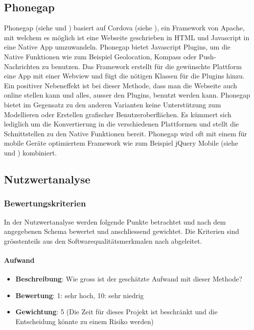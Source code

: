 \subsection{Phonegap}\label{architektur_phonegapt}
Phonegap (siehe \cite{phonegap} und \cite{wargo2012phonegap}) basiert auf Cordova (siehe \cite{cordova}), ein Framework von Apache, mit welchem es möglich ist eine Webseite geschrieben in HTML und Javascript in eine Native App umzuwandeln. Phonegap bietet Javascript Plugins, um die Native Funktionen wie zum Beispiel Geolocation, Kompass oder Push-Nachrichten zu benutzen. Das Framework erstellt für die gewünschte Plattform eine App mit einer Webview und fügt die nötigen Klassen für die Plugins hinzu. Ein positiver Nebeneffekt ist bei dieser Methode, dass man die Webseite auch online stellen kann und alles, ausser den Plugins, benutzt werden kann. Phonegap bietet im Gegensatz zu den anderen Varianten keine Unterstützung zum Modellieren oder Erstellen grafischer Benutzeroberflächen. Es kümmert sich lediglich um die Konvertierung in die verschiedenen Plattformen und stellt die Schnittstellen zu den Native Funktionen bereit. Phonegap wird oft mit einem für mobile Geräte optimiertem Framework wie zum Beispiel jQuery Mobile (siehe \cite{jquery_mobile} und \cite{reid2011jquery}) kombiniert.

\newpage
\subsection{Nutzwertanalyse}\label{architektur_nutzwertanalyse}

\subsubsection{Bewertungskriterien}\label{architektur_bewertungspunkte}

In der Nutzwertanalyse werden folgende Punkte betrachtet und nach dem angegebenen Schema bewertet und anschliessend gewichtet. Die Kriterien sind grösstenteils aus den Softwarequalitätsmerkmalen nach \cite{iso_9126} abgeleitet.

\paragraph{Aufwand}
\begin{itemize}
	\item \textbf{Beschreibung}: Wie gross ist der geschätzte Aufwand mit dieser Methode?
	\item \textbf{Bewertung}: 1: sehr hoch, 10: sehr niedrig
	\item \textbf{Gewichtung}: 5 (Die Zeit für dieses Projekt ist beschränkt und die Entscheidung könnte zu einem Risiko werden)
\end{itemize}

